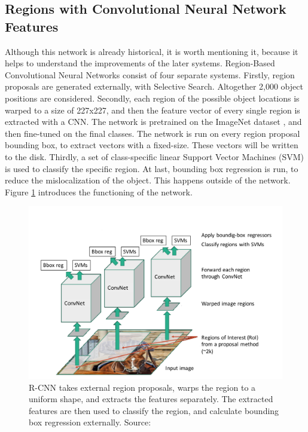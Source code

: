 \subsection{Regions with Convolutional Neural Network Features}
Although this network is already historical, it is worth mentioning it, because it helps to understand the improvements of the later systems. Region-Based Convolutional Neural Networks \cite{DBLP:journals/corr/GirshickDDM13} consist of four separate systems. Firstly, region proposals are generated externally, with Selective Search. Altogether 2,000 object positions are considered. Secondly, each region of the possible object locations is warped to a size of 227x227, and then the feature vector of every single region is extracted with a CNN. The network \cite{NIPS2012_4824} is pretrained on the ImageNet dataset \cite{imagenet_cvpr09}, and then fine-tuned on the final classes. The network is run on every region proposal bounding box, to extract vectors with a fixed-size. These vectors will be written to the disk. Thirdly, a set of class-specific linear Support Vector Machines (SVM) \cite{Cortes:1995:SN:218919.218929} is used to classify the specific region. At last, bounding box regression is run, to reduce the mislocalization of the object. This happens outside of the network. Figure \ref{fig:rcnn} introduces the functioning of the network.
\bigbreak
\begin{figure}[h!]
	\centering
	\includegraphics[width=12cm]{images/mt/rcnn.pdf}
	\caption{R-CNN takes external region proposals, warps the region to a uniform shape, and extracts the features separately. The extracted features are then used to classify the region, and calculate bounding box regression externally. Source: \cite{Girshick16}}
	\label{fig:rcnn}
\end{figure}
\bigbreak
